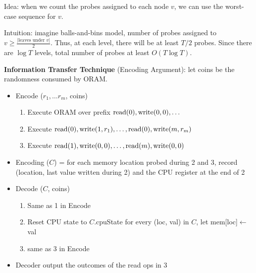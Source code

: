 Idea: when we count the probes assigned to each node $v$, we can use the worst-case sequence for $v$.

Intuition: imagine balls-and-bins model, number of probes assigned to $v \geq\frac{|\mbox{leaves under } v|}{2}$. Thus, at each level, there will be at least $T/2$ probes. Since there are $\log T$ levels, total number of probes at least $O(T \log T)$.

\textbf{Information Transfer Technique} (Encoding Argument): let coins be the randomness consumed by ORAM.
\begin{itemize}
  \item Encode ($r_1, \dots r_m$, coins)
  \begin{enumerate}
    \item Execute ORAM over prefix $\mbox{read}(0), \mbox{write}(0, 0), \dots$
    \item Execute $\mbox{read}(0), \mbox{write}(1, r_1), \dots, \mbox{read}(0), \mbox{write}(m, r_m)$
    \item Execute $\mbox{read}(1), \mbox{write}(0, 0), \dots, \mbox{read}(m), \mbox{write}(0, 0)$
  \end{enumerate}
  \item Encoding ($C$) = for each memory location probed during 2 and 3, record (location, last value written during 2) and the CPU register at the end of 2
  \item Decode ($C$, coins)
  \begin{enumerate}
    \item Same as 1 in Encode
    \item Reset CPU state to $C$.cpuState for every (loc, val) in $C$, let mem[loc]$\leftarrow$ val
    \item same as 3 in Encode
  \end{enumerate}
  \item Decoder output the outcomes of the read ops in 3
\end{itemize}

